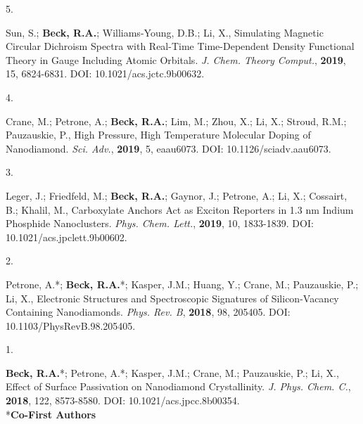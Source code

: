 \begin{cvpublications}



\cvpublication
{5.}
{\parbox[t]{0.95\textwidth}{\strut Sun, S.; \textbf{Beck, R.A.}; Williams-Young, D.B.; Li, X.,
Simulating Magnetic Circular Dichroism Spectra with Real-Time Time-Dependent Density Functional Theory in Gauge Including Atomic Orbitals.
\textit{J. Chem. Theory Comput.}, \textbf{2019}, 15, 6824-6831.
DOI: 10.1021/acs.jctc.9b00632.}}




\cvpublication
{4.}
{\parbox[t]{0.95\textwidth}{\strut Crane, M.; Petrone, A.; \textbf{Beck, R.A.}; Lim, M.; Zhou, X.; Li, X.; Stroud, R.M.; Pauzauskie, P.,
High Pressure, High Temperature Molecular Doping of Nanodiamond.
\textit{Sci. Adv.}, \textbf{2019}, 5, eaau6073.
DOI: 10.1126/sciadv.aau6073.}}




\cvpublication
{3.}
{\parbox[t]{0.95\textwidth}{\strut Leger, J.; Friedfeld, M.; \textbf{Beck, R.A.}; Gaynor, J.; Petrone, A.; Li, X.; Cossairt, B.; Khalil, M., 
Carboxylate Anchors Act as Exciton Reporters in 1.3 nm Indium Phosphide Nanoclusters.
\textit{Phys. Chem. Lett.}, \textbf{2019}, 10, 1833-1839.
DOI: 10.1021/acs.jpclett.9b00602.}}




\cvpublication
{2.}
{\parbox[t]{0.95\textwidth}{\strut Petrone, A.*; \textbf{Beck, R.A.}*; Kasper, J.M.; Huang, Y.; Crane, M.; Pauzauskie, P.; Li, X., 
Electronic Structures and Spectroscopic Signatures of Silicon-Vacancy Containing Nanodiamonds.
\textit{Phys. Rev. B}, \textbf{2018}, 98, 205405.
DOI: 10.1103/PhysRevB.98.205405.}}




\cvpublication
{1.}
{\parbox[t]{0.95\textwidth}{\strut \textbf{Beck, R.A.}*; Petrone, A.*; Kasper, J.M.; Crane, M.; Pauzauskie, P.; Li, X., 
Effect of Surface Passivation on Nanodiamond Crystallinity.
\textit{J. Phys. Chem. C.}, \textbf{2018}, 122, 8573-8580.
DOI: 10.1021/acs.jpcc.8b00354. \\ \**\textbf{Co-First Authors}}}



\end{cvpublications}
